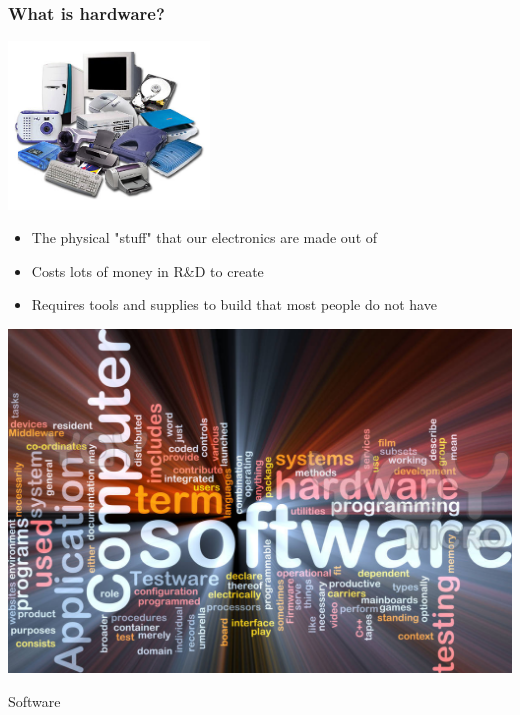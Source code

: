 \documentclass{beamer}
\begin{document}
\begin{frame}
  \frametitle{What is hardware?}
  \begin{center}
    \includegraphics[width=0.4\textwidth]{../img/hardware-2}
  \end{center}
  \begin{itemize}
  \item The physical "stuff" that our electronics are made out of
  \item Costs lots of money in R\&D to create
  \item Requires tools and supplies to build that most people do not have
  \end{itemize}

\end{frame}

\begin{frame}
  \begin{center} 
    \includegraphics[width=1\textwidth]{../img/software-words-3}
    \begin{Huge} Software \end{Huge} 
  \end{center}
\end{frame}
\end{document}

